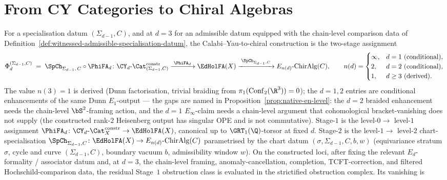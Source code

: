 \chapter{From CY Categories to Chiral Algebras}
\label{ch:cy-to-chiral}

\begin{theorem}
\label{thm:phi-two-stage-factorisation-headline}
For a specialisation datum $(\Sigma_{d-1}, C)$, and at $d=3$ for an
admissible datum equipped with the chain-level comparison data of
Definition~\ref{def:witnessed-admissible-specialisation-datum}, the
Calabi--Yau-to-chiral construction is the two-stage assignment
\[
 \Phi_d^{(\Sigma_{d-1}, C)} \;=\; \SpCh_{\Sigma_{d-1},\, C} \circ \PhiFA_d
 \colon \CY_d\text{-}\Cat^{\mathrm{constr}}_{(\Sigma_{d-1},C)}
 \xrightarrow{\;\PhiFA_d\;} \EdHolFA(X)
 \xrightarrow{\;\SpCh_{\Sigma_{d-1},C}\;} E_{n(d)}\text{-}\mathrm{ChirAlg}(C),
 \qquad
 n(d)=
 \begin{cases}
 \infty, & d=1 \ \text{(conditional)},\\
 2, & d=2 \ \text{(conditional)},\\
 1, & d\geq3 \ \text{(derived)}.
 \end{cases}
\]
The value $n(3) = 1$ is derived (Dunn factorisation, trivial braiding
from $\pi_1(\mathrm{Conf}_2(\R^3)) = 0$); the $d = 1, 2$ entries are
conditional enhancements of the same Dunn $E_1$-output --- the gaps
are named in Proposition~\ref{prop:native-en-level}: the $d = 2$
braided enhancement needs the chain-level $\bS^2$-framing action, and
the $d = 1$ $E_\infty$-claim needs a chain-level argument that
cohomological bracket-vanishing does not supply (the constructed
rank-$2$ Heisenberg output has singular OPE and is not commutative).
Stage-$1$ is the level-$0 \to$ level-$1$ assignment
$\PhiFA_d \colon \CY_d\text{-}\Cat^{\mathrm{constr}}_X \to \EdHolFA(X)$, canonical up to
$\GRT_1(\Q)$-torsor at fixed $d$. Stage-$2$ is the level-$1 \to$
level-$2$ chart-specialisation
$\SpCh_{\Sigma_{d-1}, C} \colon \EdHolFA(X) \to E_{n(d)}\text{-}\mathrm{ChirAlg}(C)$
parametrised by the chart datum $(\sigma, \Sigma_{d-1}, C, b, w)$
(equivariance stratum $\sigma$, cycle and curve $(\Sigma_{d-1}, C)$,
boundary vacuum $b$, admissibility window $w$).
On the constructed loci, after fixing the relevant $E_d$-formality /
associator datum and, at $d=3$, the chain-level framing,
anomaly-cancellation, completion, TCFT-correction, and filtered
Hochschild-comparison data, the residual Stage~$1$ obstruction
class is evaluated in the strictified obstruction complex. Its vanishing is

\end{theorem}
